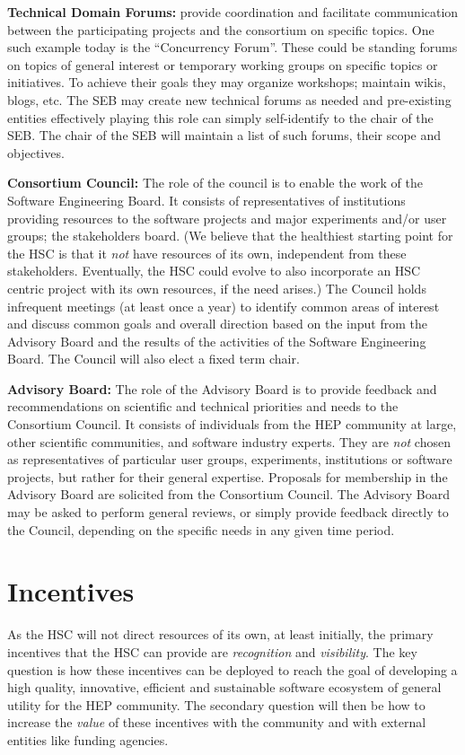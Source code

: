 \documentclass[12pt,letterpaper,fleqn]{article}
\begin{document}
{\bf Technical Domain Forums:} provide coordination and facilitate
communication between the participating projects and the consortium
on specific topics. One such example today is the ``Concurrency Forum''.
These could be standing forums on topics of general interest or
temporary working groups on specific topics or initiatives.
To achieve their goals they may organize workshops; maintain wikis,
blogs, etc. The SEB may create new technical forums as needed and pre-existing entities effectively playing this role can simply self-identify
to the chair of the SEB. The chair of the SEB will maintain a list
of such forums, their scope and objectives.

{\bf Consortium Council:} The role of the council is to enable the
work of the Software Engineering Board.
It consists of representatives of
institutions providing resources to the software projects
and major experiments and/or user groups; the stakeholders board.
(We believe that the healthiest starting point
for the HSC is that it {\em not} have resources of its own, independent
from these stakeholders.  Eventually,
the HSC could evolve to also incorporate an HSC centric project with its own resources, if the need arises.)  
The Council holds infrequent meetings (at least once a year) to 
identify common areas of interest and discuss common goals and overall
direction based on the input from the Advisory Board and the results of the activities of the Software Engineering Board. The Council will
also elect a fixed term chair. 

{\bf Advisory Board:} The role of the Advisory Board is to provide
feedback and recommendations on scientific and technical priorities
and needs to the Consortium Council. It consists of individuals from
the HEP community at large, other scientific communities, and
software industry experts. They are {\em not} chosen as representatives
of particular user groups, experiments, institutions or software
projects, but rather for their general expertise.
Proposals for membership in the Advisory Board are solicited from the Consortium Council. The Advisory Board may be asked to perform general
reviews, or simply provide feedback directly to the Council, depending
on the specific needs in any given time period. 


\section{Incentives}

As the HSC will not direct resources of its own, at least initially,
the primary incentives that the HSC can provide are {\em recognition}
and {\em visibility}. The key question is how these incentives can be 
deployed to reach the goal of developing a high quality, innovative, 
efficient and sustainable software ecosystem of general utility for the 
HEP community. The secondary question will then be how to increase 
the {\em value} of these incentives with the community and with external 
entities like funding agencies.
\end{document}
